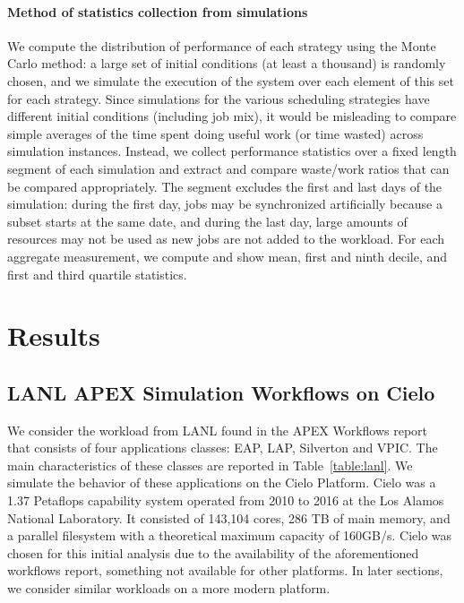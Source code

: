 \documentclass[conference,nofonttune]{IEEEtran}
\begin{document}
\paragraph*{Method of statistics collection from simulations}
We compute the distribution of performance of each strategy using the
Monte Carlo method: a large set of initial conditions (at least a
thousand) is randomly chosen, and we simulate the execution of the
system over each element of this set for each strategy. Since
simulations for the various scheduling strategies have different
initial conditions (including job mix), it would be misleading to
compare simple averages of the time spent doing useful work (or time
wasted) across simulation instances. Instead, we collect performance
statistics over a fixed length segment of each simulation and extract
and compare waste/work ratios that can be compared appropriately. The
segment excludes the first and last days of the simulation: during the
first day, jobs may be synchronized artificially because a subset
starts at the same date, and during the last day, large amounts of
resources may not be used as new jobs are not added to the workload.
For each aggregate measurement, we compute and show mean, first and
ninth decile, and first and third quartile statistics. 

%

\section{Results}\label{sec:results}

\subsection{LANL APEX Simulation Workflows on Cielo}

We consider the workload from LANL found in the APEX Workflows
report~\cite{apex2016} that consists of four applications classes: EAP, LAP,
Silverton and VPIC. The main characteristics of these classes are reported in
Table~\ref{table:lanl}. We simulate the behavior of these applications on the
Cielo Platform. Cielo was a 1.37 Petaflops capability system operated from 2010
to 2016 at the Los Alamos National Laboratory.  It consisted of 143,104 cores,
286 TB of main memory, and a parallel filesystem with a theoretical maximum
capacity of 160GB/s.  Cielo was chosen for this initial analysis due to the
availability of the aforementioned workflows report, something not available for
other platforms. In later sections, we consider similar workloads on a more
modern platform.
\end{document}
